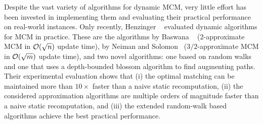 Despite the vast variety of algorithms for dynamic MCM, very little effort
has been invested in implementing them and evaluating their practical performance
on real-world instances. Only recently, Henzinger \etal~\cite{DBLP:conf/esa/Henzinger0P020}
evaluated dynamic algorithms for MCM in practice. These are the algorithms by
Baswana \etal~\cite{DBLP:journals/siamcomp/BaswanaGS18} ($2$-approximate MCM in
$\mathcal{O}(\sqrt{n})$ update time), by Neiman and Solomon~\cite{DBLP:journals/talg/NeimanS16}
($3/2$-approximate MCM in $\mathcal{O}(\sqrt{m})$ update time), and two novel algorithms:
one based on random walks and one that uses a depth-bounded blossom algorithm to
find augmenting paths. Their experimental evaluation shows that (i) the optimal
matching can be maintained more than $10\times$ faster than a naive static
recomputation, (ii) the considered approximation algorithms are multiple orders
of magnitude faster than a naive static recomputation, and (iii) the
extended random-walk based algorithms achieve the best practical performance.

